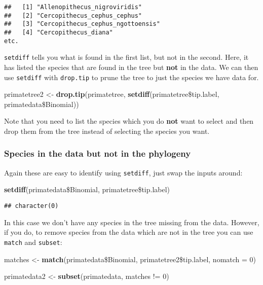 \documentclass[11pt]{article}
\newcommand{\KeywordTok}[1]{\textcolor[rgb]{0.13,0.29,0.53}{\textbf{{#1}}}}
\newcommand{\DataTypeTok}[1]{\textcolor[rgb]{0.13,0.29,0.53}{{#1}}}
\newcommand{\DecValTok}[1]{\textcolor[rgb]{0.00,0.00,0.81}{{#1}}}
\newcommand{\StringTok}[1]{\textcolor[rgb]{0.31,0.60,0.02}{{#1}}}
\newcommand{\NormalTok}[1]{{#1}}
\begin{document}
\begin{verbatim}
##   [1] "Allenopithecus_nigroviridis"                  
##   [2] "Cercopithecus_cephus_cephus"                  
##   [3] "Cercopithecus_cephus_ngottoensis"             
##   [4] "Cercopithecus_diana" 
etc.
\end{verbatim}

\texttt{setdiff} tells you what is found in the first list, but not in the second. Here, it has listed the species that are found in the tree but \textbf{not} in the data. We can then use \texttt{setdiff} with \texttt{drop.tip} to prune the tree to just the species we have data for. 

\begin{snugshade}
\begin{Highlighting}[]
\NormalTok{primatetree2 <-}\StringTok{ }\KeywordTok{drop.tip}\NormalTok{(primatetree, }\KeywordTok{setdiff}\NormalTok{(primatetree\$tip.label, }
                          \NormalTok{primatedata\$Binomial))}
\end{Highlighting}
\end{snugshade}

Note that you need to list the species which you do \textbf{not} want to select and then drop them from the tree instead of selecting the species you want.

\subsubsection{Species in the data but not in the phylogeny}
Again these are easy to identify using \texttt{setdiff}, just swap the inputs around:

\begin{snugshade}
\begin{Highlighting}[]
\KeywordTok{setdiff}\NormalTok{(primatedata\$Binomial, primatetree\$tip.label)}
\end{Highlighting}
\end{snugshade}

\begin{verbatim}
## character(0)
\end{verbatim}

In this case we don't have any species in the tree missing from the data. However, if you do, to remove species from the data which are not in the tree you can use \texttt{match} and \texttt{subset}:

\begin{snugshade}
\begin{Highlighting}[]
\NormalTok{matches <-}\StringTok{ }\KeywordTok{match}\NormalTok{(primatedata\$Binomial, primatetree2\$tip.label, }\DataTypeTok{nomatch =} \DecValTok{0}\NormalTok{)}

\NormalTok{primatedata2 <-}\StringTok{ }\KeywordTok{subset}\NormalTok{(primatedata, matches !=}\StringTok{ }\DecValTok{0}\NormalTok{)}
\end{Highlighting}
\end{snugshade}
\end{document}
